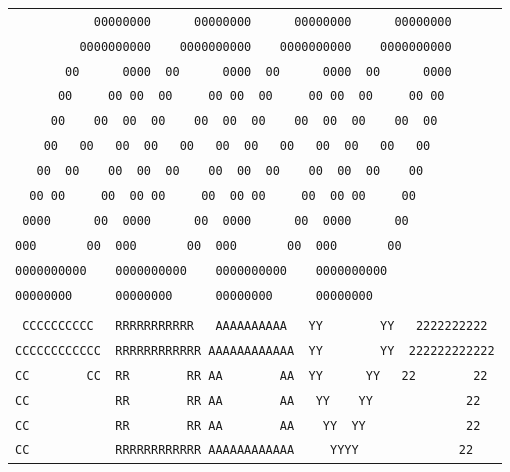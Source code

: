 {\scriptsize\begin{tabular}{l}
\texttt{\ \ \ \ \ \ \ \ \ \ \ 00000000\ \ \ \ \ \ 00000000\ \ \ \ \ \ 00000000\ \ \ \ \ \ 00000000}\\
\texttt{\ \ \ \ \ \ \ \ \ 0000000000\ \ \ \ 0000000000\ \ \ \ 0000000000\ \ \ \ 0000000000}\\
\texttt{\ \ \ \ \ \ \ 00\ \ \ \ \ \ 0000\ \ 00\ \ \ \ \ \ 0000\ \ 00\ \ \ \ \ \ 0000\ \ 00\ \ \ \ \ \ 0000}\\
\texttt{\ \ \ \ \ \ 00\ \ \ \ \ 00\ 00\ \ 00\ \ \ \ \ 00\ 00\ \ 00\ \ \ \ \ 00\ 00\ \ 00\ \ \ \ \ 00\ 00}\\
\texttt{\ \ \ \ \ 00\ \ \ \ 00\ \ 00\ \ 00\ \ \ \ 00\ \ 00\ \ 00\ \ \ \ 00\ \ 00\ \ 00\ \ \ \ 00\ \ 00}\\
\texttt{\ \ \ \ 00\ \ \ 00\ \ \ 00\ \ 00\ \ \ 00\ \ \ 00\ \ 00\ \ \ 00\ \ \ 00\ \ 00\ \ \ 00\ \ \ 00}\\
\texttt{\ \ \ 00\ \ 00\ \ \ \ 00\ \ 00\ \ 00\ \ \ \ 00\ \ 00\ \ 00\ \ \ \ 00\ \ 00\ \ 00\ \ \ \ 00}\\
\texttt{\ \ 00\ 00\ \ \ \ \ 00\ \ 00\ 00\ \ \ \ \ 00\ \ 00\ 00\ \ \ \ \ 00\ \ 00\ 00\ \ \ \ \ 00}\\
\texttt{\ 0000\ \ \ \ \ \ 00\ \ 0000\ \ \ \ \ \ 00\ \ 0000\ \ \ \ \ \ 00\ \ 0000\ \ \ \ \ \ 00}\\
\texttt{000\ \ \ \ \ \ \ 00\ \ 000\ \ \ \ \ \ \ 00\ \ 000\ \ \ \ \ \ \ 00\ \ 000\ \ \ \ \ \ \ 00}\\
\texttt{0000000000\ \ \ \ 0000000000\ \ \ \ 0000000000\ \ \ \ 0000000000}\\
\texttt{00000000\ \ \ \ \ \ 00000000\ \ \ \ \ \ 00000000\ \ \ \ \ \ 00000000}\\
\texttt{}\\
\texttt{\ CCCCCCCCCC\ \ \ RRRRRRRRRRR\ \ \ AAAAAAAAAA\ \ \ YY\ \ \ \ \ \ \ \ YY\ \ \ 2222222222}\\
\texttt{CCCCCCCCCCCC\ \ RRRRRRRRRRRR\ AAAAAAAAAAAA\ \ YY\ \ \ \ \ \ \ \ YY\ \ 222222222222}\\
\texttt{CC\ \ \ \ \ \ \ \ CC\ \ RR\ \ \ \ \ \ \ \ RR\ AA\ \ \ \ \ \ \ \ AA\ \ YY\ \ \ \ \ \ YY\ \ \ 22\ \ \ \ \ \ \ \ 22}\\
\texttt{CC\ \ \ \ \ \ \ \ \ \ \ \ RR\ \ \ \ \ \ \ \ RR\ AA\ \ \ \ \ \ \ \ AA\ \ \ YY\ \ \ \ YY\ \ \ \ \ \ \ \ \ \ \ \ \ 22}\\
\texttt{CC\ \ \ \ \ \ \ \ \ \ \ \ RR\ \ \ \ \ \ \ \ RR\ AA\ \ \ \ \ \ \ \ AA\ \ \ \ YY\ \ YY\ \ \ \ \ \ \ \ \ \ \ \ \ \ 22}\\
\texttt{CC\ \ \ \ \ \ \ \ \ \ \ \ RRRRRRRRRRRR\ AAAAAAAAAAAA\ \ \ \ \ YYYY\ \ \ \ \ \ \ \ \ \ \ \ \ \ 22}\\

\end{tabular}}

